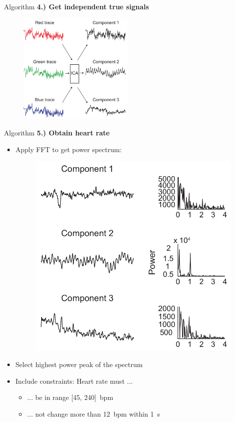 \documentclass{beamer}
\begin{document}
\begin{frame}{Algorithm}
\textbf{\Large 4.) Get independent true signals}
\begin{figure}
	\includegraphics[width=0.5\textwidth]{paper_ica.png}
\end{figure}
\end{frame}

\begin{frame}{Algorithm}
\textbf{\Large 5.) Obtain heart rate}
\begin{itemize}
	\item Apply FFT to get power spectrum:
		\begin{figure}
			\includegraphics[height=0.3\paperheight]{paper_power_spectrum.png}
		\end{figure}
	\item Select highest power peak of the spectrum
	\item Include constraints: Heart rate must ...
		\begin{itemize}[label=-]
			\item ... be in range [45, 240]~bpm
			\item ... not change more than 12~bpm within 1~s
		\end{itemize}
\end{itemize}
\end{frame}
\end{document}
